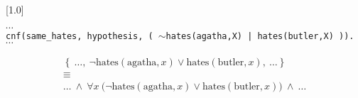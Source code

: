 	\scalebox{0.8}[1.0]{\begin{minipage}{40em}
	\texttt{$\cdots$\\
		cnf(same\_hates, hypothesis, ( $\sim$hates(agatha,X) | hates(butler,X) )).\\
		$\cdots$\\	
}
\end{minipage}}
		\begin{gather*}
			\left\{\ \ldots,\
			\lnot \text{hates}(\text{agatha},x)
			\lor 
			\text{hates}(\text{butler},x),\ \ldots\right\} 
			\\\equiv\\
			\ldots\ \land\ 
				\forall x\ {(}
				\lnot \text{hates}(\text{agatha},x)
				\lor 
				\text{hates}(\text{butler},x) {)}
			\  \land\ \ldots 
			\end{gather*}
		
		\vspace{1em}
	
	\nocite{SS98}
	
	

